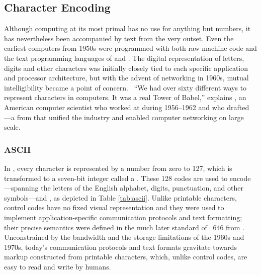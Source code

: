 \documentclass[a5paper,10pt]{book}
\begin{document}
\subsection{Character Encoding}
Although computing at its most primal has no use for anything but numbers, it
has nevertheless been accompanied by text from the very outset. Even the
earliest computers from 1950s were programmed with both raw machine code and
the text programming languages of  and . The
digital representation of letters, digits and other characters was initially
closely tied to each specific application and processor architecture, but with
the advent of networking in 1960s, mutual intelligibility became a point of
concern.
\ ``We had over sixty different ways to represent characters in
computers. It was a real Tower of Babel,'' explains \cite{brandel99}
, an American computer scientist who worked at 
during 1956--1962 and who drafted ---a
 from \citeyear{asa63} that unified the industry and
enabled computer networking on large scale.

\subsubsection{ASCII}
In , every character is represented by a number from zero to 127,
which is transformed to a seven-bit integer called a .
These 128 codes are used to encode ---spanning the
letters of the English alphabet, digits, punctuation, and other symbols---and
, as depicted in Table \ref{tab:ascii}.  Unlike printable
characters, control codes have no fixed visual representation and they were used
to implement application-specific communication protocols and text formatting;
their precise semantics were defined in the much later standard of
~646 from \citeyear{iso72} \cite{iso72}. Unconstrained by the
bandwidth and the storage limitations of the 1960s and 1970s, today's
communication protocols and text formats gravitate towards markup constructed
from printable characters, which, unlike control codes, are easy to read and
write by humans.
\end{document}

